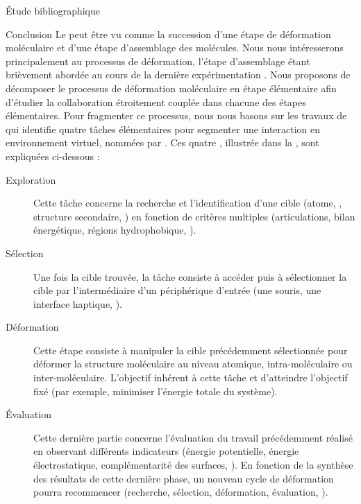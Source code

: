 \documentclass[myfrancais,ngerman,english,french]{mythesis}
\begin{document}
\begin{mychapter}{Étude bibliographique}
\begin{mysection}{Conclusion}
			Le  peut être vu comme la succession d'une étape de déformation moléculaire et d'une étape d'assemblage des molécules.
			Nous nous intéresserons principalement au processus de déformation, l'étape d'assemblage étant brièvement abordée au cours de la dernière expérimentation .
			Nous proposons de décomposer le processus de déformation moléculaire en étape élémentaire afin d'étudier la collaboration étroitement couplée dans chacune des étapes élémentaires.
			Pour fragmenter ce processus, nous nous basons sur les travaux de  qui identifie quatre tâches élémentaires pour segmenter une interaction en environnement virtuel, nommées  par .
			Ces quatre , illustrée dans la , sont expliquées ci-dessous :
			\begin{description}
				\item[Exploration] Cette tâche concerne la recherche et l'identification d'une cible (atome, , structure secondaire, \myetc) en fonction de critères multiples (articulations, bilan énergétique, régions hydrophobique, \myetc).
				\item[Sélection] Une fois la cible trouvée, la tâche consiste à accéder puis à sélectionner la cible par l'intermédiaire d'un périphérique d'entrée (une souris, une interface haptique, \myetc).
				\item[Déformation] Cette étape consiste à manipuler la cible précédemment sélectionnée pour déformer la structure moléculaire au niveau atomique, intra-moléculaire ou inter-moléculaire.
					L'objectif inhérent à cette tâche et d'atteindre l'objectif fixé (par exemple, minimiser l'énergie totale du système).
				\item[Évaluation] Cette dernière partie concerne l'évaluation du travail précédemment réalisé en observant différents indicateurs (énergie potentielle, énergie électrostatique, complémentarité des surfaces, \myetc).
					En fonction de la synthèse des résultats de cette dernière phase, un nouveau cycle de déformation pourra recommencer (recherche, sélection, déformation, évaluation, \myetc).
			\end{description}


\end{mysection}
\end{mychapter}
\end{document}
